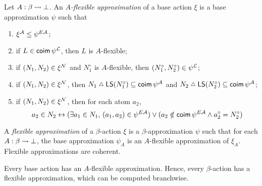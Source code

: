 \begin{definition}
  \label{def:FlexApprox}
  \leanok
  Let \( A : \beta \rightsquigarrow \bot \).
  An \emph{\( A \)-flexible approximation} of a base action \( \xi \) is a base approximation \( \psi \) such that
  \begin{enumerate}
    \item \( \xi^{\mathcal A} \leq \psi^{E{\mathcal A}} \);
    \item if \( L \in \operatorname{\mathsf{coim}} \psi^{\mathcal L} \), then \( L \) is \( A \)-flexible;
    \item if \( (N_1, N_2) \in \xi^{\mathcal N} \) and \( N_1^\circ \) is \( A \)-flexible, then \( (N_1^\circ, N_2^\circ) \in \psi^{\mathcal L} \);
    \item if \( (N_1, N_2) \in \xi^{\mathcal N} \), then \( N_1 \symmdiff \LS(N_1^\circ) \subseteq \coim \psi^\Atom \) and \( N_2 \symmdiff \LS(N_2^\circ) \subseteq \coim \psi^\Atom \);
    \item if \( (N_1, N_2) \in \xi^{\mathcal N} \), then for each atom \( a_2 \),
    \[ a_2 \in N_2 \leftrightarrow (\exists a_1 \in N_1,\, (a_1, a_2) \in \psi^{E{\mathcal A}}) \vee (a_2 \notin \operatorname{\mathsf{coim}} \psi^{E{\mathcal A}} \wedge a_2^\circ = N_2^\circ) \]
  \end{enumerate}
  A \emph{flexible approximation} of a \( \beta \)-action \( \xi \) is a \( \beta \)-approximation \( \psi \) such that for each \( A : \beta \rightsquigarrow \bot \), the base approximation \( \psi_A \) is an \( A \)-flexible approximation of \( \xi_A \).
  Flexible approximations are coherent.
\end{definition}
\begin{proposition}
  \label{prop:exists_flexApprox}
  \leanok
  Every base action has an \( A \)-flexible approximation.
  Hence, every \( \beta \)-action has a flexible approximation, which can be computed branchwise.
\end{proposition}
